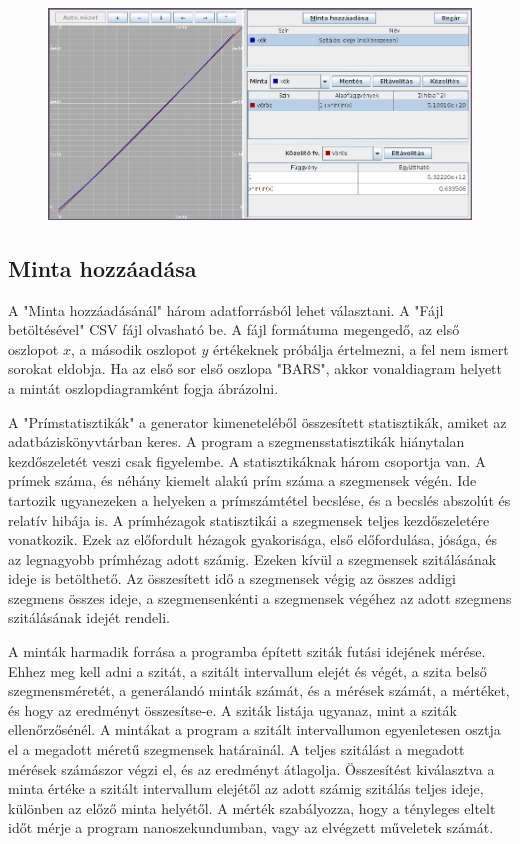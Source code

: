 \begin{figure}[h]
\centering
\includegraphics[scale=0.5]{graph.png}
\end{figure}

\subsection{Minta hozzáadása} %

A "Minta hozzáadásánál" három adatforrásból lehet választani.
A "Fájl betöltésével" CSV fájl olvasható be. A fájl formátuma megengedő, az első oszlopot $x$, a második oszlopot $y$ értékeknek próbálja értelmezni, a fel nem ismert sorokat eldobja.
Ha az első sor első oszlopa "BARS",
akkor vonaldiagram helyett a mintát oszlopdiagramként fogja ábrázolni.

A "Prímstatisztikák" a generator kimeneteléből összesített statisztikák, amiket az adatbáziskönyvtárban keres.
A program a szegmensstatisztikák hiánytalan kezdőszeletét veszi csak figyelembe.
A statisztikáknak három csoportja van. A prímek száma, és néhány kiemelt alakú prím száma a szegmensek végén. Ide tartozik ugyanezeken a helyeken a prímszámtétel becslése, és a becslés abszolút és relatív hibája is.
A prímhézagok statisztikái a szegmensek teljes kezdőszeletére vonatkozik.
Ezek az előfordult hézagok gyakorisága, első előfordulása, jósága, és az legnagyobb prímhézag adott számig.
Ezeken kívül a szegmensek szitálásának ideje is betölthető.
Az összesített idő a szegmensek végig az összes addigi szegmens összes ideje, a szegmensenkénti a szegmensek végéhez az adott szegmens szitálásának idejét rendeli.

A minták harmadik forrása a programba épített sziták futási idejének mérése.
Ehhez meg kell adni a szitát, a szitált intervallum elejét és végét, a szita belső szegmensméretét, a generálandó minták számát, és a mérések számát, a mértéket, és hogy az eredményt összesítse-e.
A sziták listája ugyanaz, mint a sziták ellenőrzősénél.
A mintákat a program a szitált intervallumon egyenletesen osztja el a megadott méretű szegmensek határainál.
A teljes szitálást a megadott mérések számászor végzi el, és az eredményt átlagolja.
Összesítést kiválasztva a minta értéke a szitált intervallum elejétől az adott számig szitálás teljes ideje, különben az előző minta helyétől.
A mérték szabályozza, hogy a tényleges eltelt időt mérje a program nanoszekundumban, vagy az elvégzett műveletek számát.

